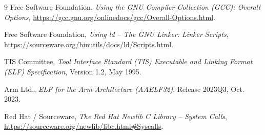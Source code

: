 \documentclass[12pt,a4paper]{article}
\begin{document}

\tableofcontents
\newpage



\begin{thebibliography}{9}
Free Software Foundation, \textit{Using the GNU Compiler Collection (GCC): Overall Options}, \url{https://gcc.gnu.org/onlinedocs/gcc/Overall-Options.html}.

Free Software Foundation, \textit{Using ld -- The GNU Linker: Linker Scripts}, \url{https://sourceware.org/binutils/docs/ld/Scripts.html}.

TIS Committee, \textit{Tool Interface Standard (TIS) Executable and Linking Format (ELF) Specification}, Version 1.2, May 1995.

Arm Ltd., \textit{ELF for the Arm Architecture (AAELF32)}, Release 2023Q3, Oct. 2023.

Red Hat / Sourceware, \textit{The Red Hat Newlib C Library -- System Calls}, \url{https://sourceware.org/newlib/libc.html#Syscalls}.
\end{thebibliography}
\end{document}
